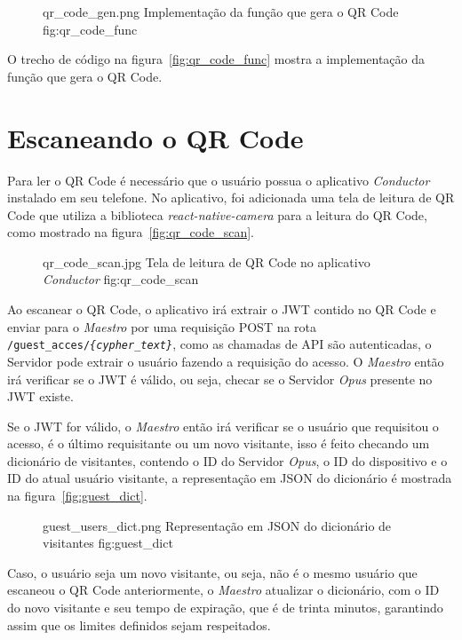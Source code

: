 \begin{figure}[h!]
    {qr_code_gen.png}
    {Implementação da função que gera o QR Code}
    {fig:qr_code_func}
\end{figure}

O trecho de código na figura~\ref{fig:qr_code_func} mostra a implementação da função que gera o QR Code.

\section{Escaneando o QR Code}
\label{sec:escaneando_qr_code}

Para ler o QR Code é necessário que o usuário possua o aplicativo \emph{Conductor} instalado em seu telefone. No aplicativo, foi adicionada uma tela
de leitura de QR Code que utiliza a biblioteca \emph{react-native-camera} para a leitura do QR Code, como mostrado na figura~\ref{fig:qr_code_scan}.

\begin{figure}[h!]
    {qr_code_scan.jpg}
    {Tela de leitura de QR Code no aplicativo \emph{Conductor}}
    {fig:qr_code_scan}
\end{figure}

Ao escanear o QR Code, o aplicativo irá extrair o JWT contido no QR Code e enviar para o \emph{Maestro} por uma requisição POST na rota
\texttt{/guest\_acces/\emph{\{cypher\_text\}}}, como as chamadas de API são autenticadas, o Servidor pode extrair o usuário fazendo a requisição
do acesso. O \emph{Maestro} então irá verificar se o JWT é válido, ou seja, checar se o Servidor \emph{Opus} presente no JWT existe.

Se o JWT for válido, o \emph{Maestro} então irá verificar se o usuário que requisitou o acesso, é o último requisitante ou um novo visitante,
isso é feito checando um dicionário de visitantes, contendo o ID do Servidor \emph{Opus}, o ID do dispositivo e o ID do atual usuário visitante,
a representação em JSON do dicionário é mostrada na figura~\ref{fig:guest_dict}.

\begin{figure}[h!]
    {guest_users_dict.png}
    {Representação em JSON do dicionário de visitantes}
    {fig:guest_dict}
\end{figure}

Caso, o usuário seja um novo visitante, ou seja, não é o mesmo usuário que escaneou o QR Code anteriormente, o \emph{Maestro} atualizar o dicionário,
com o ID do novo visitante e seu tempo de expiração, que é de trinta minutos, garantindo assim que os limites definidos sejam respeitados.

